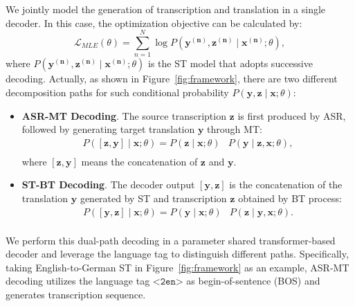 \documentclass[letterpaper]{article} %
\begin{document}
We jointly model the generation of transcription and translation in a single decoder.
In this case, the optimization objective can be calculated by:
\begin{equation}
    \mathcal{L}_{MLE}(\theta)=\sum_{n=1}^{N} \log P\left(\mathbf{y^{(n)}}, \mathbf{z^{(n)}} \mid \mathbf{x^{(n)}} ; \theta\right),
    \label{eq:loss_dual_ways_mle_1}
\end{equation}
where $P\left(\mathbf{y^{(n)}}, \mathbf{z^{(n)}} \mid \mathbf{x^{(n)}} ; \theta\right)$ is the ST model that adopts successive decoding.
Actually, as shown in Figure~\ref{fig:framework}, there are two different decomposition paths for such conditional probability $P\left(\mathbf{y}, \mathbf{z} \mid \mathbf{x} ; \theta\right)$:
\begin{itemize}
    \item  \textbf{ASR-MT Decoding}. The source transcription $\mathbf{z}$ is first produced by ASR, followed by generating target translation $\mathbf{y}$ through MT:
    \begin{equation}
        \begin{aligned}
            P\left([\mathbf{z},\mathbf{y}] \mid \mathbf{x} ; \theta\right)= P\left( \mathbf{z} \mid \mathbf{x} ; \theta\right) & P\left( \mathbf{y} \mid \mathbf{z}, \mathbf{x} ; \theta\right), \\
        \end{aligned}
        \label{eq:asr_mt_prob}
    \end{equation}
    where $[\mathbf{z},\mathbf{y}]$ means the concatenation of $\mathbf{z}$ and $\mathbf{y}$.
    \item \textbf{ST-BT Decoding}. The decoder output $[\mathbf{y},\mathbf{z}]$ is the concatenation of the translation $\mathbf{y}$ generated by ST and transcription $\mathbf{z}$ obtained by BT process:
    \begin{equation}
        \begin{aligned}
            P\left([\mathbf{y},\mathbf{z}]\mid \mathbf{x} ; \theta\right) =  P\left( \mathbf{y} \mid \mathbf{x} ; \theta\right) & P\left( \mathbf{z} \mid \mathbf{y}, \mathbf{x} ; \theta\right). \\
        \end{aligned}
        \label{eq:st_bt_prob}
    \end{equation}
\end{itemize}
We perform this dual-path decoding in a parameter shared transformer-based decoder and leverage the language tag to distinguish different paths.
Specifically, taking English-to-German ST in Figure~\ref{fig:framework} as an example, ASR-MT decoding utilizes the language tag $\texttt{<2en>}$ as begin-of-sentence (BOS) and generates transcription sequence.
\end{document}
